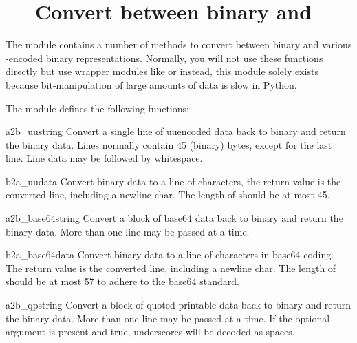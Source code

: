 \section{ ---
         Convert between binary and \ASCII{}}



The  module contains a number of methods to convert
between binary and various \ASCII{}-encoded binary
representations. Normally, you will not use these functions directly
but use wrapper modules like  or
 instead, this module solely
exists because bit-manipulation of large amounts of data is slow in
Python.

The  module defines the following functions:

\begin{funcdesc}{a2b_uu}{string}
Convert a single line of uuencoded data back to binary and return the
binary data. Lines normally contain 45 (binary) bytes, except for the
last line. Line data may be followed by whitespace.
\end{funcdesc}

\begin{funcdesc}{b2a_uu}{data}
Convert binary data to a line of \ASCII{} characters, the return value
is the converted line, including a newline char. The length of
 should be at most 45.
\end{funcdesc}

\begin{funcdesc}{a2b_base64}{string}
Convert a block of base64 data back to binary and return the
binary data. More than one line may be passed at a time.
\end{funcdesc}

\begin{funcdesc}{b2a_base64}{data}
Convert binary data to a line of \ASCII{} characters in base64 coding.
The return value is the converted line, including a newline char.
The length of  should be at most 57 to adhere to the base64
standard.
\end{funcdesc}

\begin{funcdesc}{a2b_qp}{string}
Convert a block of quoted-printable data back to binary and return the
binary data. More than one line may be passed at a time.
If the optional argument  is present and true, underscores
will be decoded as spaces.
\end{funcdesc}

